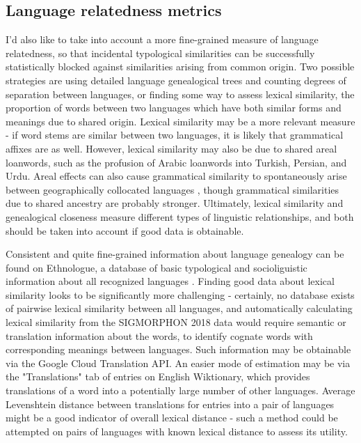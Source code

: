 \subsection{Language relatedness metrics}

I'd also like to take into account a more fine-grained measure of language relatedness, so that incidental typological similarities can be successfully statistically blocked against similarities arising from common origin. Two possible strategies are using detailed language genealogical trees and counting degrees of separation between languages, or finding some way to assess lexical similarity, the proportion of words between two languages which have both similar forms and meanings due to shared origin. Lexical similarity may be a more relevant measure - if word stems are similar between two languages, it is likely that grammatical affixes are as well. However, lexical similarity may also be due to shared areal loanwords, such as the profusion of Arabic loanwords into Turkish, Persian, and Urdu. Areal effects can also cause grammatical similarity to spontaneously arise between geographically collocated languages \parencite{Ponti2018}, though grammatical similarities due to shared ancestry are probably stronger. Ultimately, lexical similarity and genealogical closeness measure different types of linguistic relationships, and both should be taken into account if good data is obtainable.

Consistent and quite fine-grained information about language genealogy can be found on Ethnologue, a database of basic typological and socioliguistic information about all recognized languages \parencite{Ethnologue}. Finding good data about lexical similarity looks to be significantly more challenging - certainly, no database exists of pairwise lexical similarity between all languages, and automatically calculating lexical similarity from the SIGMORPHON 2018 data would require semantic or translation information about the words, to identify cognate words with corresponding meanings between languages. Such information may be obtainable via the Google Cloud Translation API. An easier mode of estimation may be via the "Translations" tab of entries on English Wiktionary, which provides translations of a word into a potentially large number of other languages. Average Levenshtein distance between translations for entries into a pair of languages might be a good indicator of overall lexical distance - such a method could be attempted on pairs of languages with known lexical distance to assess its utility.

